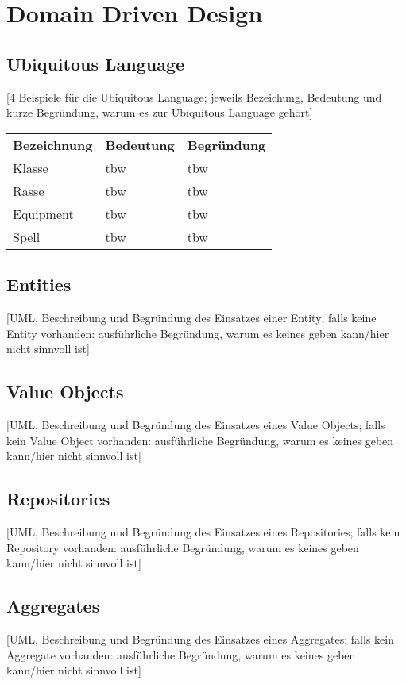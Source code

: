 \chapter{Domain Driven Design}
\section{Ubiquitous Language}
[4 Beispiele für die Ubiquitous Language; jeweils Bezeichung, Bedeutung und kurze Begründung, warum es zur Ubiquitous Language gehört]
\begin{table}[!ht]
\centering
\begin{tabular}{lll}
\textbf{Bezeichnung} & \textbf{Bedeutung} & \textbf{Begründung} \\
Klasse               & tbw                & tbw                 \\
Rasse                & tbw                & tbw                 \\
Equipment            & tbw                & tbw                 \\
Spell                & tbw                & tbw                
\end{tabular}
\end{table}

\FloatBarrier
\section{Entities}
[UML, Beschreibung und Begründung des Einsatzes einer Entity; falls keine Entity vorhanden: ausführliche Begründung, warum es keines geben kann/hier nicht sinnvoll ist]

\section{Value Objects}
[UML, Beschreibung und Begründung des Einsatzes eines Value Objects; falls kein Value Object vorhanden: ausführliche Begründung, warum es keines geben kann/hier nicht sinnvoll ist]

\section{Repositories}
[UML, Beschreibung und Begründung des Einsatzes eines Repositories; falls kein Repository vorhanden: ausführliche Begründung, warum es keines geben kann/hier nicht sinnvoll ist]

\section{Aggregates}
[UML, Beschreibung und Begründung des Einsatzes eines Aggregates; falls kein Aggregate vorhanden: ausführliche Begründung, warum es keines geben kann/hier nicht sinnvoll ist]